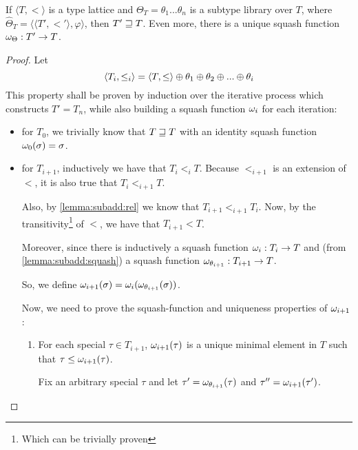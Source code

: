 \documentclass[main.tex]{subfiles}
\begin{document}
\begin{prop}
    If $\langle T, \less \rangle$ is a type lattice and
    $\Theta_T = \theta_1 ... \theta_n$ is a subtype library over $T$, where
    $\hat{\Theta}_T = \langle \langle T', \less' \rangle, \varphi \rangle$,
    then $T' \sqsupseteq T$. Even more, there is a unique squash function
    $\omega_{\Theta} : T' \rightarrow T$.
\end{prop}
\begin{proof}
    Let \[
        \langle T_i, \leq_i \rangle = \langle T, \leq \rangle
        \oplus \theta_1 \oplus \theta_2 \oplus ... \oplus \theta_i
    \]
    This property shall be proven by induction over the iterative process
    which constructs $T' = T_n$, while also building a squash function
    $\omega_i$ for each iteration:
    \begin{itemize}
        \item for $T_0$, we trivially know that $T \sqsupseteq T$ with an identity
            squash function $\omega_0(\sigma) = \sigma$.
        \item for $T_{i + 1}$, inductively we have that $T_i \less_i T$.
            Because $\less_{i + 1}$ is an extension of $\less$, it is also true
            that $T_i \less_{i + 1} T$.

            Also, by \cref{lemma:subadd:rel} we know that $T_{i + 1} \less_{i + 1} T_i$.
            Now, by the transitivity\footnote{Which can be trivially
            proven} of $\less$, we have that $T_{i + 1} \less T$.

            Moreover, since there is inductively a squash function
            $\omega_i : T_i \rightarrow T$ and (from \cref{lemma:subadd:squash})
            a squash function $\omega_{\theta_{i + 1}} : T_{i + 1} \rightarrow T$.

            So, we define
            $\omega_{i + 1}(\sigma) = \omega_i(\omega_{\theta_{i + 1}}(\sigma))$.

            Now, we need to prove the squash-function and uniqueness
            properties of $\omega_{i + 1}$:
            \begin{enumerate}
                \item For each special
                    $\tau \in T_{i + 1}$, $\omega_{i + 1}(\tau)$ is a unique
                    minimal element in $T$ such that $\tau \leq \omega_{i + 1}(\tau)$.

                    Fix an arbitrary special $\tau$ and let
                    $\tau' = \omega_{\theta_{i + 1}}(\tau)$ and
                    $\tau'' = \omega_{i + 1}(\tau')$.


\end{enumerate}
\end{itemize}
\end{proof}
\end{document}
